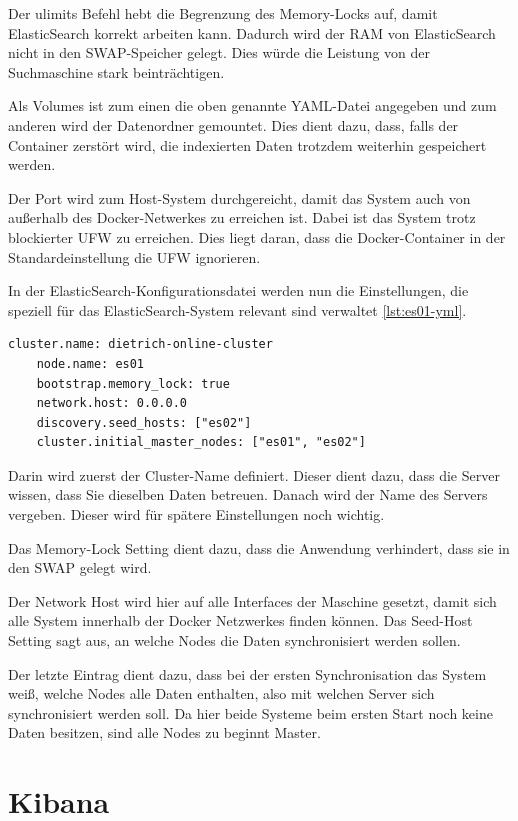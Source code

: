 Der ulimits Befehl hebt die Begrenzung des Memory-Locks auf, damit ElasticSearch korrekt arbeiten kann. Dadurch wird der RAM von ElasticSearch nicht in den SWAP-Speicher gelegt. Dies würde die Leistung von der Suchmaschine stark beinträchtigen.

Als Volumes ist zum einen die oben genannte YAML-Datei angegeben und zum anderen wird der Datenordner gemountet. Dies dient dazu, dass, falls der Container zerstört wird, die indexierten Daten trotzdem weiterhin gespeichert werden.

Der Port wird zum Host-System durchgereicht, damit das System auch von außerhalb des Docker-Netwerkes zu erreichen ist. Dabei ist das System trotz blockierter UFW zu erreichen. Dies liegt daran, dass die Docker-Container in der Standardeinstellung die UFW ignorieren.

In der ElasticSearch-Konfigurationsdatei werden nun die Einstellungen, die speziell für das ElasticSearch-System relevant sind verwaltet \ref{lst:es01-yml}. 

\begin{lstlisting}[language=XML, frame=single, label={lst:es01-yml}] 
	cluster.name: dietrich-online-cluster
	node.name: es01
	bootstrap.memory_lock: true
	network.host: 0.0.0.0
	discovery.seed_hosts: ["es02"]
	cluster.initial_master_nodes: ["es01", "es02"]
\end{lstlisting}

Darin wird zuerst der Cluster-Name definiert. Dieser dient dazu, dass die Server wissen, dass Sie dieselben Daten betreuen. 
Danach wird der Name des Servers vergeben. Dieser wird für spätere Einstellungen noch wichtig.

Das Memory-Lock Setting dient dazu, dass die Anwendung verhindert, dass sie in den SWAP gelegt wird.

Der Network Host wird hier auf alle Interfaces der Maschine gesetzt, damit sich alle System innerhalb der Docker Netzwerkes finden können.
Das Seed-Host Setting sagt aus, an welche Nodes die Daten synchronisiert werden sollen.

Der letzte Eintrag dient dazu, dass bei der ersten Synchronisation das System weiß, welche Nodes alle Daten enthalten, also mit welchen Server sich synchronisiert werden soll. Da hier beide Systeme beim ersten Start noch keine Daten besitzen, sind alle Nodes zu beginnt Master. 


\section{Kibana}

